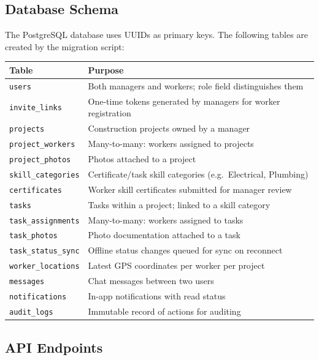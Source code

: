 \documentclass[12pt,a4paper]{article}
\begin{document}
\subsection{Database Schema}

The PostgreSQL database uses UUIDs as primary keys. The following tables are created by the migration script:

\begin{tabular}{ll}
\toprule
\textbf{Table} & \textbf{Purpose} \\
\midrule
\texttt{users}              & Both managers and workers; role field distinguishes them \\
\texttt{invite\_links}      & One-time tokens generated by managers for worker registration \\
\texttt{projects}           & Construction projects owned by a manager \\
\texttt{project\_workers}   & Many-to-many: workers assigned to projects \\
\texttt{project\_photos}    & Photos attached to a project \\
\texttt{skill\_categories}  & Certificate/task skill categories (e.g.\ Electrical, Plumbing) \\
\texttt{certificates}       & Worker skill certificates submitted for manager review \\
\texttt{tasks}              & Tasks within a project; linked to a skill category \\
\texttt{task\_assignments}  & Many-to-many: workers assigned to tasks \\
\texttt{task\_photos}       & Photo documentation attached to a task \\
\texttt{task\_status\_sync} & Offline status changes queued for sync on reconnect \\
\texttt{worker\_locations}  & Latest GPS coordinates per worker per project \\
\texttt{messages}           & Chat messages between two users \\
\texttt{notifications}      & In-app notifications with read status \\
\texttt{audit\_logs}        & Immutable record of actions for auditing \\
\bottomrule
\end{tabular}

\subsection{API Endpoints}
\end{document}

